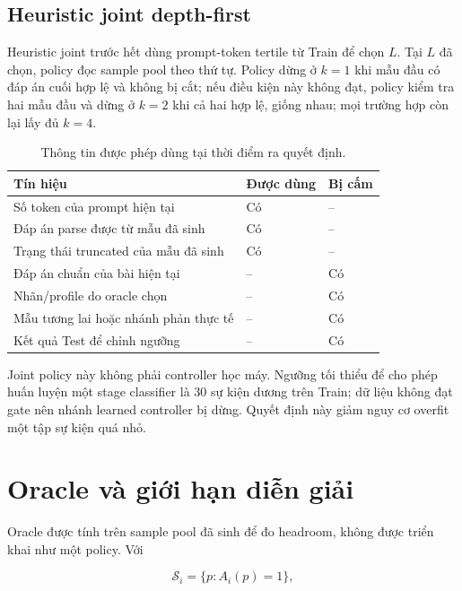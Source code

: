\subsection{Heuristic joint depth-first}

Heuristic joint trước hết dùng prompt-token tertile từ Train để chọn $L$. Tại $L$ đã
chọn, policy đọc sample pool theo thứ tự. Policy dừng ở $k=1$ khi mẫu đầu có đáp án
cuối hợp lệ và không bị cắt; nếu điều kiện này không đạt, policy kiểm tra hai mẫu đầu
và dừng ở $k=2$ khi cả hai hợp lệ, giống nhau; mọi trường hợp còn lại lấy đủ $k=4$.

\begin{table}[htbp]
  \centering
  \caption{Thông tin được phép dùng tại thời điểm ra quyết định.}
  \label{tab:policy-signals}
  \begin{tabular}{p{}p{}p{}}
    \toprule
    Tín hiệu & Được dùng & Bị cấm \\
    \midrule
    Số token của prompt hiện tại & Có & -- \\
    Đáp án parse được từ mẫu đã sinh & Có & -- \\
    Trạng thái truncated của mẫu đã sinh & Có & -- \\
    Đáp án chuẩn của bài hiện tại & -- & Có \\
    Nhãn/profile do oracle chọn & -- & Có \\
    Mẫu tương lai hoặc nhánh phản thực tế & -- & Có \\
    Kết quả Test để chỉnh ngưỡng & -- & Có \\
    \bottomrule
  \end{tabular}
\end{table}

Joint policy này không phải controller học máy. Ngưỡng tối thiểu để cho phép huấn
luyện một stage classifier là 30 sự kiện dương trên Train; dữ liệu không đạt gate nên
nhánh learned controller bị dừng. Quyết định này giảm nguy cơ overfit một tập sự kiện
quá nhỏ.

\section{Oracle và giới hạn diễn giải}

Oracle được tính trên sample pool đã sinh để đo headroom, không được triển khai như
một policy. Với

\begin{equation}
  \mathcal{S}_i=\{p:A_i(p)=1\},
\end{equation}

